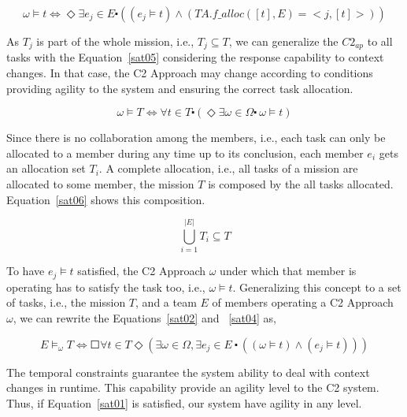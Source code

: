 \begin{center}
\begin{equation}
\label{sat05}
\omega \models t \Longleftrightarrow   \Diamond \exists e_j \in E \centerdot ((e_j \models t) \land (TA.f\_alloc([t],E)=<j,[t]>))
\end{equation}
\end{center}

As $T_j$ is part of the whole mission, i.e., $T_j \subseteq T$, we can generalize the $C2_{ap}$ to all tasks with the Equation~\ref{sat05} considering the response capability to context changes. In that case, the C2 Approach may change according to conditions providing agility to the system and ensuring the correct task allocation.

\begin{center}
\begin{equation}
\label{sat05}
\omega \models T \Longleftrightarrow \forall t \in T \centerdot (\Diamond \exists \omega \in \Omega \centerdot \ \omega \models t )
\end{equation}
\end{center}

Since there is no collaboration among the members, i.e., each task can only be allocated to a member during any time up to its conclusion, each member $e_i$ gets an allocation set $T_i$. A complete allocation, i.e., all tasks of a mission are allocated to some member, the mission $T$ is composed by the all tasks allocated. Equation~\ref{sat06} shows this composition.

\begin{center}
\begin{equation}
\label{sat06}
\bigcup\limits ^{|E|}_{i=1} T_i \subseteq T
\end{equation}
\end{center}

To have $e_j \models t$ satisfied, the C2 Approach $\omega$ under which that member is operating has to satisfy the task too, i.e., $\omega \models t$. Generalizing this concept to a set of tasks, i.e., the mission $T$, and a team $E$ of members operating a C2 Approach $\omega$, we can rewrite the Equations~\ref{sat02} and ~\ref{sat04} as,

\begin{center}
\begin{equation}
\label{sat01}
E \models_\omega T \Longleftrightarrow \Square \forall t \in T \Diamond (\exists \omega \in \Omega, \exists e_j \in E \ \centerdot \ ((\omega \models t) \land (e_j \models t)))
\end{equation}
\end{center}

The temporal constraints guarantee the system ability to deal with context changes in runtime. This capability provide an agility level to the C2 system. Thus, if Equation~\ref{sat01} is satisfied, our system have agility in any level.
